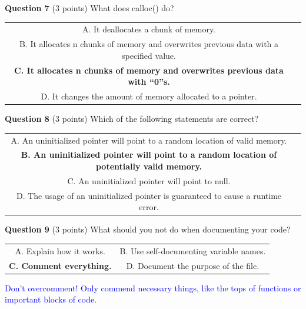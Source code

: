 \documentclass{exam}
\begin{document}
\vspace{10px}

\textbf{Question 7} (3 points) What does calloc() do?

\begin{center}

\begin{tabular} { c  c } 
  A. It deallocates a chunk of memory. \\
  B. It allocates n chunks of memory and overwrites previous data with a specified value. \\ 
  \textbf{C. It allocates n chunks of memory and overwrites previous data with “0”s. }\\
  D. It changes the amount of memory allocated to a pointer.
\end{tabular}

\end{center}

\vspace{10px}

\textbf{Question 8} (3 points) Which of the following statements are correct?

\begin{center}

\begin{tabular} { c  c } 
  A. An uninitialized pointer will point to a random location of valid memory. \\
  \textbf{B. An uninitialized pointer will point to a random location of potentially valid memory. }\\
  C. An uninitialized pointer will point to null. \\ 
  D. The usage of an uninitialized pointer is guaranteed to cause a runtime error.
\end{tabular}

\end{center}

\vspace{10px}

\textbf{Question 9} (3 points) What should you not do when documenting your code?

\begin{center}

\begin{tabular} { c  c } 
  A. Explain how it works. &
  B. Use self-documenting variable names. \\ 
  \textbf{C. Comment everything. }&
  D. Document the purpose of the file.
\end{tabular}

\vspace{5px}
\textcolor{blue}{Don't overcomment! Only commend necessary things, like the tops of functions or important blocks of code.}

\end{center}
\end{document}
